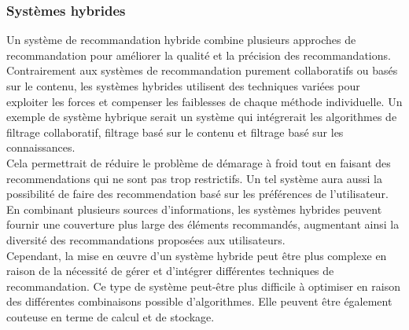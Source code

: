 \documentclass[11pt]{article}
\begin{document}
\subsubsection{Systèmes hybrides}
Un système de recommandation hybride combine plusieurs approches de recommandation pour améliorer la qualité et la précision des recommandations. Contrairement aux systèmes de recommandation purement collaboratifs ou basés sur le contenu, les systèmes hybrides utilisent des techniques variées pour exploiter les forces et compenser les faiblesses de chaque méthode individuelle. Un exemple de système hybrique serait un système qui intégrerait les algorithmes de filtrage collaboratif, filtrage basé sur le contenu et filtrage basé sur les connaissances. \\

Cela permettrait de réduire le problème de démarage à froid tout en faisant des recommendations qui ne sont pas trop restrictifs. Un tel système aura aussi la possibilité de faire des recommendation basé sur les préférences de l'utilisateur.\\

En combinant plusieurs sources d'informations, les systèmes hybrides peuvent fournir une couverture plus large des éléments recommandés, augmentant ainsi la diversité des recommandations proposées aux utilisateurs.\\

Cependant, la mise en œuvre d'un système hybride peut être plus complexe en raison de la nécessité de gérer et d'intégrer différentes techniques de recommandation. Ce type de système peut-être plus difficile à optimiser en raison des différentes combinaisons possible d'algorithmes. Elle peuvent être également couteuse en terme de calcul et de stockage.






\newpage
\end{document}
